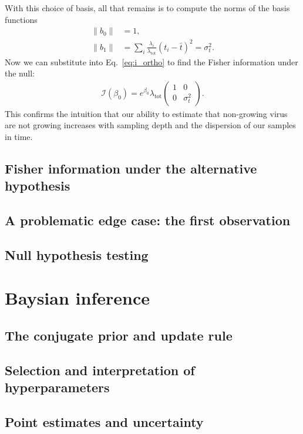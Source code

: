 \documentclass[12pt, letterpaper]{article}
\newcommand{ \lambtot }{\lambda_{\text{tot}}}
\begin{document}
With this choice of basis, all that remains is to compute the norms of the basis functions
\begin{align}
    \|b_0\| &= 1, \\
    \|b_1\| &= \sum_i \frac{\lambda_i}{\lambtot} {(t_i - \bar{t})}^2 = \sigma_t^2.
\end{align}
Now we can substitute into Eq.~\ref{eq:i_ortho} to find the Fisher information under the null:
\begin{align}
    \mathcal{I}(\beta_0) = e^{\beta_0} \lambtot
    \begin{pmatrix}
        1 & 0 \\
        0 & \sigma_t^2
    \end{pmatrix}.
\end{align}
This confirms the intuition that our ability to estimate that non-growing virus are not growing increases with sampling depth and the dispersion of our samples in time.

\subsection{Fisher information under the alternative hypothesis}

\subsection{A problematic edge case: the first observation}

\subsection{Null hypothesis testing}


\section{Baysian inference}

\subsection{The conjugate prior and update rule}

\subsection{Selection and interpretation of hyperparameters}

\subsection{Point estimates and uncertainty}
\end{document}
